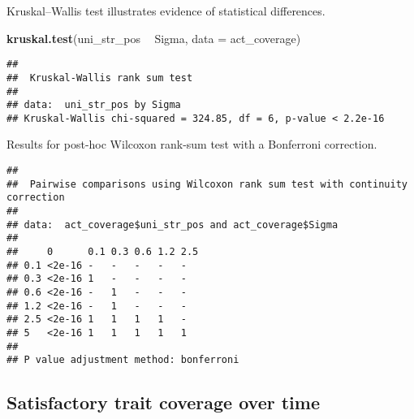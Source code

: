 \documentclass[]{book}
\newenvironment{Shaded}{\begin{snugshade}}{\end{snugshade}}
\newcommand{\DataTypeTok}[1]{\textcolor[rgb]{0.13,0.29,0.53}{#1}}
\newcommand{\KeywordTok}[1]{\textcolor[rgb]{0.13,0.29,0.53}{\textbf{#1}}}
\newcommand{\NormalTok}[1]{#1}
\newcommand{\OperatorTok}[1]{\textcolor[rgb]{0.81,0.36,0.00}{\textbf{#1}}}
\newcommand{\OtherTok}[1]{\textcolor[rgb]{0.56,0.35,0.01}{#1}}
\newcommand{\StringTok}[1]{\textcolor[rgb]{0.31,0.60,0.02}{#1}}
\begin{document}
Kruskal--Wallis test illustrates evidence of statistical differences.

\begin{Shaded}
\begin{Highlighting}[]
\KeywordTok{kruskal.test}\NormalTok{(uni_str_pos }\OperatorTok{~}\StringTok{ }\NormalTok{Sigma, }\DataTypeTok{data =}\NormalTok{ act_coverage)}
\end{Highlighting}
\end{Shaded}

\begin{verbatim}
## 
##  Kruskal-Wallis rank sum test
## 
## data:  uni_str_pos by Sigma
## Kruskal-Wallis chi-squared = 324.85, df = 6, p-value < 2.2e-16
\end{verbatim}

Results for post-hoc Wilcoxon rank-sum test with a Bonferroni correction.

\begin{Shaded}
\end{Shaded}

\begin{verbatim}
## 
##  Pairwise comparisons using Wilcoxon rank sum test with continuity correction 
## 
## data:  act_coverage$uni_str_pos and act_coverage$Sigma 
## 
##     0      0.1 0.3 0.6 1.2 2.5
## 0.1 <2e-16 -   -   -   -   -  
## 0.3 <2e-16 1   -   -   -   -  
## 0.6 <2e-16 -   1   -   -   -  
## 1.2 <2e-16 -   1   -   -   -  
## 2.5 <2e-16 1   1   1   1   -  
## 5   <2e-16 1   1   1   1   1  
## 
## P value adjustment method: bonferroni
\end{verbatim}

\hypertarget{satisfactory-trait-coverage-over-time-4}{%
\subsection{Satisfactory trait coverage over time}\label{satisfactory-trait-coverage-over-time-4}}
\end{document}
